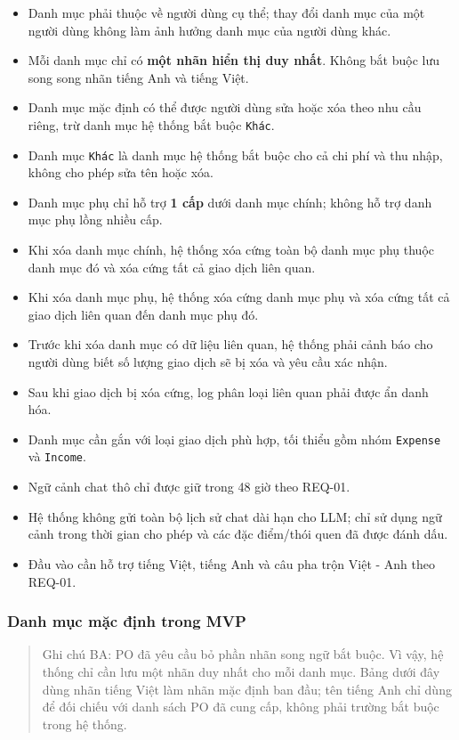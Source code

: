 \begin{itemize}
\item Danh mục phải thuộc về người dùng cụ thể; thay đổi danh mục của một người dùng không làm ảnh hưởng danh mục của người dùng khác.
\item Mỗi danh mục chỉ có \textbf{một nhãn hiển thị duy nhất}. Không bắt buộc lưu song song nhãn tiếng Anh và tiếng Việt.
\item Danh mục mặc định có thể được người dùng sửa hoặc xóa theo nhu cầu riêng, trừ danh mục hệ thống bắt buộc \texttt{Khác}.
\item Danh mục \texttt{Khác} là danh mục hệ thống bắt buộc cho cả chi phí và thu nhập, không cho phép sửa tên hoặc xóa.
\item Danh mục phụ chỉ hỗ trợ \textbf{1 cấp} dưới danh mục chính; không hỗ trợ danh mục phụ lồng nhiều cấp.
\item Khi xóa danh mục chính, hệ thống xóa cứng toàn bộ danh mục phụ thuộc danh mục đó và xóa cứng tất cả giao dịch liên quan.
\item Khi xóa danh mục phụ, hệ thống xóa cứng danh mục phụ và xóa cứng tất cả giao dịch liên quan đến danh mục phụ đó.
\item Trước khi xóa danh mục có dữ liệu liên quan, hệ thống phải cảnh báo cho người dùng biết số lượng giao dịch sẽ bị xóa và yêu cầu xác nhận.
\item Sau khi giao dịch bị xóa cứng, log phân loại liên quan phải được ẩn danh hóa.
\item Danh mục cần gắn với loại giao dịch phù hợp, tối thiểu gồm nhóm \texttt{Expense} và \texttt{Income}.
\item Ngữ cảnh chat thô chỉ được giữ trong 48 giờ theo REQ-01.
\item Hệ thống không gửi toàn bộ lịch sử chat dài hạn cho LLM; chỉ sử dụng ngữ cảnh trong thời gian cho phép và các đặc điểm/thói quen đã được đánh dấu.
\item Đầu vào cần hỗ trợ tiếng Việt, tiếng Anh và câu pha trộn Việt - Anh theo REQ-01.
\end{itemize}
\subsubsection{Danh mục mặc định trong MVP}



\begin{quote}
Ghi chú BA: PO đã yêu cầu bỏ phần nhãn song ngữ bắt buộc. Vì vậy, hệ thống chỉ cần lưu một nhãn duy nhất cho mỗi danh mục. Bảng dưới đây dùng nhãn tiếng Việt làm nhãn mặc định ban đầu; tên tiếng Anh chỉ dùng để đối chiếu với danh sách PO đã cung cấp, không phải trường bắt buộc trong hệ thống.
\end{quote}



